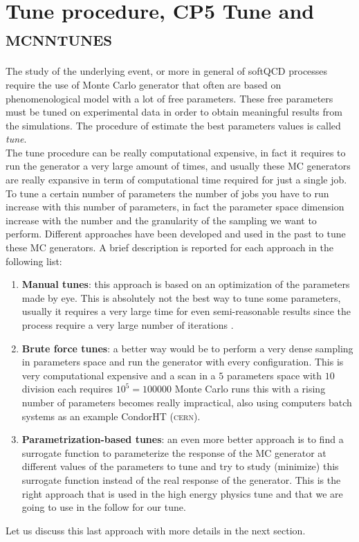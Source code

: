 \chapter{Tune procedure, CP5 Tune and \textsc{mcnntunes}}
\label{chap:TuneprocedureCP5TuneandMCNNTUNES}

The study of the underlying event, or more in general of softQCD processes require the use of Monte Carlo generator that often are based on phenomenological model with a lot of free parameters. These free parameters must be tuned on experimental data in order to obtain meaningful results from the simulations. The procedure of estimate the best parameters values is called \textit{tune}. 
\\
The tune procedure can be really computational expensive, in fact it requires to run the generator a very large amount of times, and usually these MC generators are really expansive in term of computational time required for just a single job.  
\\
To tune a certain number of parameters the number of jobs you have to run increase with this number of parameters, in fact the parameter space dimension increase with the number and the granularity of the sampling we want to perform. Different approaches have been developed and used in the past to tune these MC generators. A brief description is reported for each approach in the following list:
\begin{enumerate}[label=\arabic*)]
	\item \textbf{Manual tunes}: this approach is based on an optimization of the parameters made by eye. This is absolutely not the best way to tune some parameters, usually it requires a very large time for even semi-reasonable results since the process require a very large number of iterations .   
	\item \textbf{Brute force tunes}: a better way would be to perform a very dense sampling in parameters space and run the generator with every configuration. This is very computational expensive and a scan in a $5$ parameters space with $10$ division each requires $10^5=100000$ Monte Carlo runs this with a rising number of parameters becomes really impractical, also using computers batch systems as an example CondorHT (\textsc{cern}).   
	\item \textbf{Parametrization-based tunes}: an even more better approach is to find a surrogate function to parameterize the response of the MC generator at different values of the parameters to tune and try to study (minimize) this surrogate function instead of the real response of the generator. This is the right approach that is used in the high energy physics tune and that we are going to use in the follow for our tune.
\end{enumerate}
Let us discuss this last approach with more details in the next section.

